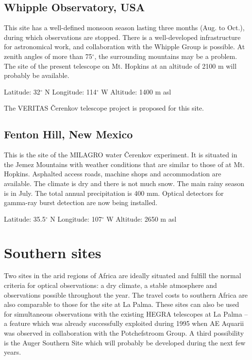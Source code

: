 \subsection{Whipple Observatory, USA}

\medskip This site has a well-defined monsoon season lasting three months (Aug. to
Oct.), during which observations are stopped. There is a well-developed
infrastructure for astronomical work, and collaboration with the Whipple
Group is possible. At zenith angles of more than 75$^\circ$, the surrounding
mountains may be a problem. The site of the present telescope on Mt. Hopkins
at an altitude of 2100 m will probably be available.

\noindent
Latitude: 32$^\circ$ N \newline
Longitude: 114$^\circ$ W \newline
Altitude: 1400 m asl

The VERITAS \v{C}erenkov telescope project is proposed for this site.

\subsection{Fenton Hill, New Mexico}

\medskip This is the site of the MILAGRO water \v{C}erenkov experiment. It is situated in
the Jemez Mountains with weather conditions that are similar to those of at
Mt. Hopkins. Asphalted access roads, machine shops and accommodation are
available. The climate is dry and there is not much snow. The main rainy
season is in July. The total annual precipitation is 400 mm. Optical
detectors for gamma-ray burst detection are now being installed.

\noindent
Latitude: 35.5$^\circ$ N\newline
Longitude: 107$^\circ$ W\newline
Altitude: 2650 m asl

\section{Southern sites}
\nopagebreak
{}

\nopagebreak
\noindent
\medskip Two sites in the arid regions of Africa are ideally situated and
fulfill the normal criteria for optical observations: a dry climate, a
stable atmosphere and observations possible throughout the year. The travel
costs to southern Africa are also comparable to those for the site at La
Palma. These sites can also be used for simultaneous observations with the
existing HEGRA telescopes at La Palma -- a feature which was already
successfully exploited during 1995 when AE Aquarii was observed in
collaboration with the Potchefstroom Group. A third possibility is the Auger
Southern Site which will probably be developed during the next few years.

